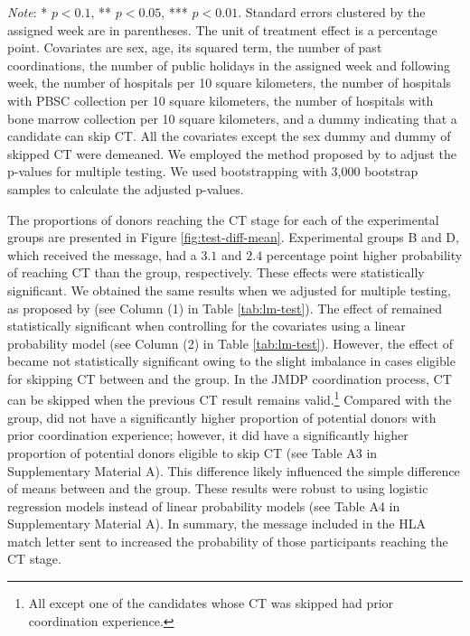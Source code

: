 \documentclass[12pt, a4paper]{article}
\newcommand{\revise}[1]{{\color{red}{#1}}}
\begin{document}
\begin{table}
\begin{threeparttable}
\begin{tablenotes}
\item \emph{Note}: * $p < 0.1$, ** $p < 0.05$, *** $p < 0.01$. Standard errors clustered by the assigned week are in parentheses. The unit of treatment effect is a percentage point. Covariates are sex, age, its squared term, the number of past coordinations, the number of public holidays in the assigned week and following week, the number of hospitals per 10 square kilometers, the number of hospitals with PBSC collection per 10 square kilometers, the number of hospitals with bone marrow collection per 10 square kilometers, and a dummy indicating that a candidate can skip CT. All the covariates except the sex dummy and dummy of skipped CT were demeaned. We employed the method proposed by \citet{List2019} to adjust the p-values for multiple testing. We used bootstrapping with 3,000 bootstrap samples to calculate the adjusted p-values.
\end{tablenotes}
\end{threeparttable}
\end{table}

The proportions of donors reaching the CT stage for each of the experimental groups are presented in Figure \ref{fig:test-diff-mean}. Experimental groups B and D, which received the \revise{matching difficulty} message, had a \(3.1\) and \(2.4\) percentage point higher probability of reaching CT than the \revise{StatusQuo} group, respectively. These effects were statistically significant. We obtained the same results when we adjusted for multiple testing, as proposed by \citet{List2019} (see Column (1) in Table \ref{tab:lm-test}). The effect of \revise{the MatchMessage group} remained statistically significant when controlling for the covariates using a linear probability model (see Column (2) in Table \ref{tab:lm-test}). However, the effect of \revise{the BothMessage group} became not statistically significant owing to the slight imbalance in cases eligible for skipping CT between \revise{the BothMessage group} and the \revise{StatusQuo} group. In the JMDP coordination process, CT can be skipped when the previous CT result remains valid.\footnote{All except one of the candidates whose CT was skipped had prior coordination experience.} Compared with the \revise{StatusQuo} group, \revise{the BothMessage group} did not have a significantly higher proportion of potential donors with prior coordination experience; however, it did have a significantly higher proportion of potential donors eligible to skip CT (see Table A3 in Supplementary Material A). This difference likely influenced the simple difference of means between \revise{the BothMessage group} and the \revise{StatusQuo} group. These results were robust to using logistic regression models instead of linear probability models (see Table A4 in Supplementary Material A). In summary, the \revise{matching difficulty} message included in the HLA match letter sent to \revise{the MatchMessage group} increased the probability of those participants reaching the CT stage.
\end{document}
